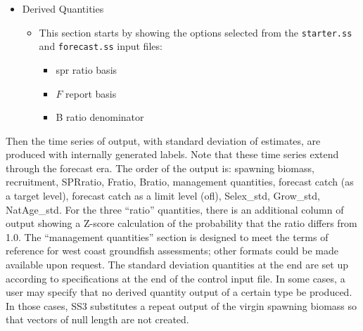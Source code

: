 \begin{itemize}
\begin{itemize}
		\end{itemize}
	\item Derived Quantities
		\begin{itemize}
			\item This section starts by showing the options selected from the \texttt{starter.ss} and \texttt{forecast.ss} input files:
				\begin{itemize}
					\item \gls{spr} ratio basis
					\item $F$ report basis
					\item B ratio denominator
				\end{itemize}
		\end{itemize}
\end{itemize}

Then the time series of output, with standard deviation of estimates, are produced with internally generated labels. Note that these time series extend through the forecast era. The order of the output is: spawning biomass, recruitment, SPRratio, Fratio, Bratio, management quantities, forecast catch (as a target level), forecast catch as a limit level (\gls{ofl}), Selex\_std, Grow\_std, NatAge\_std. For the three ``ratio'' quantities, there is an additional column of output showing a Z-score calculation of the probability that the ratio differs from 1.0. The ``management quantities'' section is designed to meet the terms of reference for west coast groundfish assessments; other formats could be made available upon request. The standard deviation quantities at the end are set up according to specifications at the end of the control input file. In some cases, a user may specify that no derived quantity output of a certain type be produced. In those cases, SS3 substitutes a repeat output of the virgin spawning biomass so that vectors of null length are not created.

